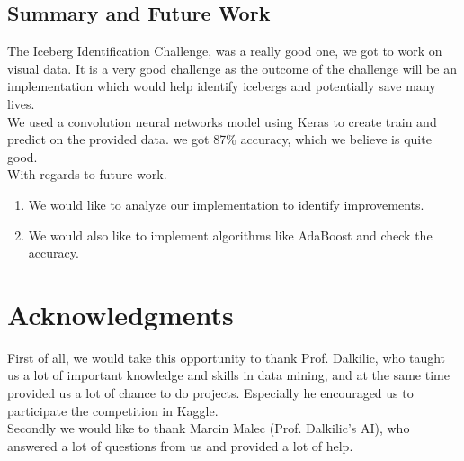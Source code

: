\documentclass[fleqn,10pt]{SelfArx} %
\begin{document}
\subsection{Summary and Future Work}
The Iceberg Identification Challenge, was a really good one, we got to work on visual data. It is a very good challenge as the outcome of the challenge will be an implementation which would help identify icebergs and potentially save many lives.\\
We used a convolution neural networks model using Keras to create train and predict on the provided data. we got 87\% accuracy, which we believe is quite good.\\
With regards to future work.\\
\begin{enumerate}
	\item We would like to analyze our implementation to identify improvements.\\
	\item We would also like to implement algorithms like AdaBoost and check the accuracy.\\
\end{enumerate}
\section*{Acknowledgments} %
First of all, we would take this opportunity to thank Prof. Dalkilic, who taught us a lot of important knowledge and skills in data mining, and at the same time provided us a lot of chance to do projects. Especially he encouraged us to participate the competition in Kaggle.\\ Secondly we would like to thank Marcin Malec (Prof. Dalkilic's AI), who answered a lot of questions from us and provided a lot of help.\\
\end{document}

